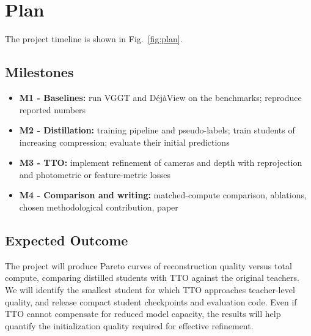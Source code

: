 \section{Plan}
\label{sec:plan}

The project timeline is shown in Fig.~\ref{fig:plan}.

\subsection{Milestones}

\begin{itemize}
    \item \textbf{M1 - Baselines:} run VGGT and DéjàView on the benchmarks; reproduce reported numbers
    \item \textbf{M2 - Distillation:} training pipeline and pseudo-labels; train students of increasing compression; evaluate their initial predictions
    \item \textbf{M3 - TTO:} implement refinement of cameras and depth with reprojection and photometric or feature-metric losses
    \item \textbf{M4 - Comparison and writing:} matched-compute comparison, ablations, chosen methodological contribution, paper
\end{itemize}

\subsection{Expected Outcome}

The project will produce Pareto curves of reconstruction quality versus total compute, comparing distilled students with TTO against the original teachers. We will identify the smallest student for which TTO approaches teacher-level quality, and release compact student checkpoints and evaluation code. Even if TTO cannot compensate for reduced model capacity, the results will help quantify the initialization quality required for effective refinement.

